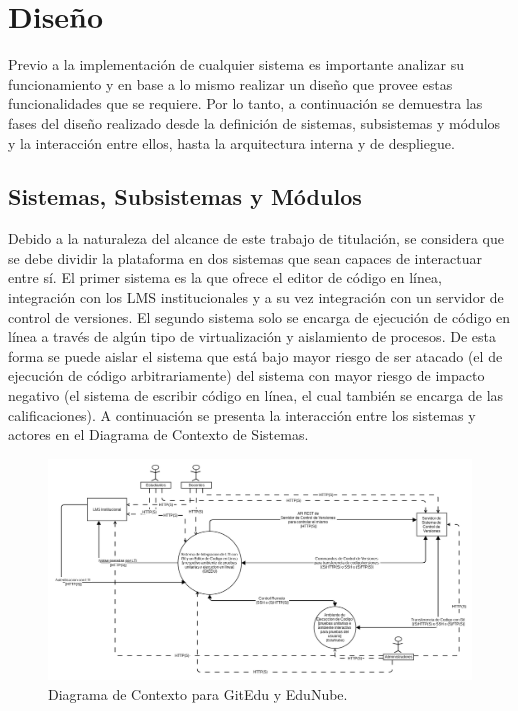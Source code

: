 \section{Diseño}
Previo a la implementación de cualquier sistema es importante analizar su funcionamiento y en base a lo mismo realizar un diseño que provee estas funcionalidades que se requiere. Por lo tanto, a continuación se demuestra las fases del diseño realizado desde la definición de sistemas, subsistemas y módulos y la interacción entre ellos, hasta la arquitectura interna y de despliegue.

\subsection{Sistemas, Subsistemas y Módulos}
    
Debido a la naturaleza del alcance de este trabajo de titulación, se considera que se debe dividir la plataforma en dos sistemas que sean capaces de interactuar entre sí. El primer sistema es la que ofrece el editor de código en línea, integración con los LMS  institucionales y a su vez integración con un servidor de control de versiones. El segundo sistema solo se encarga de ejecución de código en línea a través de algún tipo de virtualización y aislamiento de procesos. De esta forma se puede aislar el sistema que está bajo mayor riesgo de ser atacado (el de ejecución de código arbitrariamente) del sistema con mayor riesgo de impacto negativo (el sistema de escribir código en línea, el cual también se encarga de las calificaciones). A continuación se presenta la interacción entre los sistemas y actores en el Diagrama de Contexto de Sistemas.

\begin{landscape}

	\begin{figure}
	  \begin{center}
	    \includegraphics[width=1.7\textwidth]{Figures/contexto.png}
	  \end{center}
	  \caption{Diagrama de Contexto para GitEdu y EduNube.}
	  \label{context}
	\end{figure}

\end{landscape}

